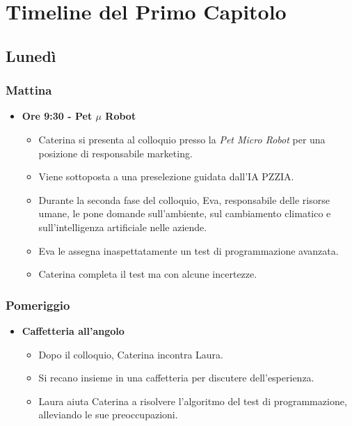 
\section*{Timeline del Primo Capitolo}

\subsection*{Lunedì}

\subsubsection*{Mattina}

\begin{itemize}
    \item \textbf{Ore 9:30 - Pet $\mu$ Robot}
    \begin{itemize}
        \item Caterina si presenta al colloquio presso la \emph{Pet Micro Robot} per una posizione di responsabile marketing.
        \item Viene sottoposta a una preselezione guidata dall'IA PZZIA.
        \item Durante la seconda fase del colloquio, Eva, responsabile delle risorse umane, le pone domande sull'ambiente, sul cambiamento climatico e sull'intelligenza artificiale nelle aziende.
        \item Eva le assegna inaspettatamente un test di programmazione avanzata.
        \item Caterina completa il test ma con alcune incertezze.
    \end{itemize}
\end{itemize}

\subsubsection*{Pomeriggio}

\begin{itemize}
    \item \textbf{Caffetteria all'angolo}
    \begin{itemize}
        \item Dopo il colloquio, Caterina incontra Laura.
        \item Si recano insieme in una caffetteria per discutere dell'esperienza.
        \item Laura aiuta Caterina a risolvere l'algoritmo del test di programmazione, alleviando le sue preoccupazioni.
    \end{itemize}
\end{itemize}

